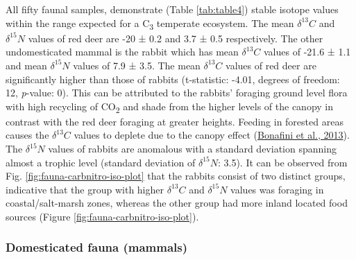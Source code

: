 \documentclass[preprint, 3p, authoryear]{elsarticle} %
\begin{document}
All fifty faunal samples, demonstrate (Table \ref{tab:table4}) stable isotope values within the range expected for a C\textsubscript{3} temperate ecosystem. The mean \(\delta ^{13}C\) and \(\delta ^{15}N\) values of red deer are -20 ± 0.2\text{\textperthousand} and 3.7 ± 0.5\text{\textperthousand} respectively. The other undomesticated mammal is the rabbit which has mean \(\delta ^{13}C\) values of -21.6 ± 1.1\text{\textperthousand} and mean \(\delta ^{15}N\) values of 7.9 ± 3.5\text{\textperthousand}. The mean \(\delta ^{13}C\) values of red deer are significantly higher than those of rabbits (t-statistic: -4.01, degrees of freedom: 12, \emph{p}-value: 0). This can be attributed to the rabbits' foraging ground level flora with high recycling of CO\textsubscript{2} and shade from the higher levels of the canopy in contrast with the red deer foraging at greater heights. Feeding in forested areas causes the \(\delta ^{13}C\) values to deplete due to the canopy effect (\protect\hyperlink{ref-bonafini_etal13}{Bonafini et al., 2013}). The \(\delta ^{15}N\) values of rabbits are anomalous with a standard deviation spanning almost a trophic level (standard deviation of \(\delta ^{15}N\): 3.5\text{\textperthousand}). It can be observed from Fig. \ref{fig:fauna-carbnitro-iso-plot} that the rabbits consist of two distinct groups, indicative that the group with higher \(\delta ^{13}C\) and \(\delta ^{15}N\) values was foraging in coastal/salt-marsh zones, whereas the other group had more inland located food sources (Figure \ref{fig:fauna-carbnitro-iso-plot}).

\hypertarget{domesticated-fauna-mammals}{%
\subsubsection{Domesticated fauna (mammals)}\label{domesticated-fauna-mammals}}
\end{document}
